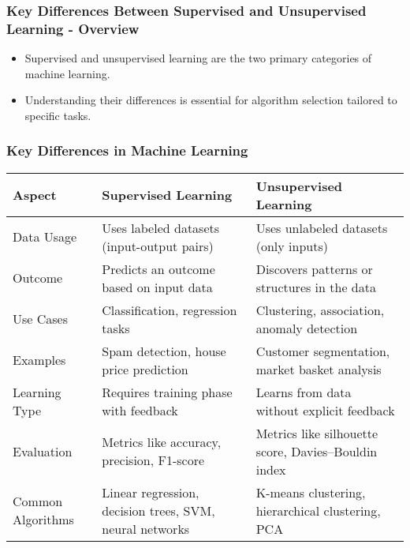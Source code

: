 \documentclass[aspectratio=169]{beamer}
\begin{document}
\begin{frame}[fragile]
    \frametitle{Key Differences Between Supervised and Unsupervised Learning - Overview}
    \begin{itemize}
        \item Supervised and unsupervised learning are the two primary categories of machine learning.
        \item Understanding their differences is essential for algorithm selection tailored to specific tasks.
    \end{itemize}
\end{frame}

\begin{frame}[fragile]
    \frametitle{Key Differences in Machine Learning}
    \begin{table}[ht]
        \centering
        \begin{tabular}{|l|l|l|}
            \hline
            \textbf{Aspect}              & \textbf{Supervised Learning}                               & \textbf{Unsupervised Learning}                             \\ \hline
            Data Usage                  & Uses labeled datasets (input-output pairs)                & Uses unlabeled datasets (only inputs)                       \\ \hline
            Outcome                     & Predicts an outcome based on input data                   & Discovers patterns or structures in the data                \\ \hline
            Use Cases                   & Classification, regression tasks                          & Clustering, association, anomaly detection                   \\ \hline
            Examples                    & Spam detection, house price prediction                     & Customer segmentation, market basket analysis               \\ \hline
            Learning Type               & Requires training phase with feedback                      & Learns from data without explicit feedback                  \\ \hline
            Evaluation                  & Metrics like accuracy, precision, F1-score                & Metrics like silhouette score, Davies–Bouldin index        \\ \hline
            Common Algorithms           & Linear regression, decision trees, SVM, neural networks   & K-means clustering, hierarchical clustering, PCA            \\ \hline
        \end{tabular}
    \end{table}
\end{frame}
\end{document}
